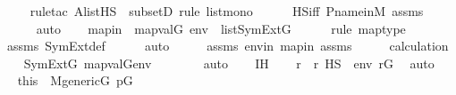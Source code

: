 \begin{isabellebody}
\ \ \ \ \isamarkupfalse%
{\isacharparenleft}{\kern0pt}rule{\isacharunderscore}{\kern0pt}tac\ A{\isacharequal}{\kern0pt}{\isachardoublequoteopen}list{\isacharparenleft}{\kern0pt}HS{\isacharparenright}{\kern0pt}{\isachardoublequoteclose}\ \ subsetD{\isacharcomma}{\kern0pt}\ rule\ list{\isacharunderscore}{\kern0pt}mono{\isacharparenright}{\kern0pt}\isanewline
\ \ \ \ \isamarkupfalse%
\ HS{\isacharunderscore}{\kern0pt}iff\ P{\isacharunderscore}{\kern0pt}name{\isacharunderscore}{\kern0pt}in{\isacharunderscore}{\kern0pt}M\ assms\isanewline
\ \ \ \ \isamarkupfalse%
\ auto\isanewline
\ \ \isamarkupfalse%
\ mapin\ {\isacharcolon}{\kern0pt}\ {\isachardoublequoteopen}map{\isacharparenleft}{\kern0pt}val{\isacharparenleft}{\kern0pt}G{\isacharparenright}{\kern0pt}{\isacharcomma}{\kern0pt}\ env{\isacharparenright}{\kern0pt}\ {\isasymin}\ list{\isacharparenleft}{\kern0pt}SymExt{\isacharparenleft}{\kern0pt}G{\isacharparenright}{\kern0pt}{\isacharparenright}{\kern0pt}{\isachardoublequoteclose}\ \isanewline
\ \ \ \ \isamarkupfalse%
{\isacharparenleft}{\kern0pt}rule\ map{\isacharunderscore}{\kern0pt}type{\isacharparenright}{\kern0pt}\isanewline
\ \ \ \ \isamarkupfalse%
\ assms\ SymExt{\isacharunderscore}{\kern0pt}def\isanewline
\ \ \ \ \isamarkupfalse%
\ auto\isanewline
\ \isanewline
\ \ \isamarkupfalse%
\ assms\ envin\ mapin\ assms{}\isanewline
\ \ \isamarkupfalse%
\ \isamarkupfalse%
\ calculation\isanewline
\ \ \isamarkupfalse%
\ {\isachardoublequoteopen}SymExt{\isacharparenleft}{\kern0pt}G{\isacharparenright}{\kern0pt}{\isacharcomma}{\kern0pt}\ map{\isacharparenleft}{\kern0pt}val{\isacharparenleft}{\kern0pt}G{\isacharparenright}{\kern0pt}{\isacharcomma}{\kern0pt}env{\isacharparenright}{\kern0pt}\ {\isasymTurnstile}\ {\isasymphi}{\isachardoublequoteclose}\isanewline
\ \ \ \ \isamarkupfalse%
\ auto\isanewline
\ \ \isamarkupfalse%
\ IH\isanewline
\ \ \isamarkupfalse%
\ r\ \ {\isachardoublequoteopen}r\ {\isasymtturnstile}HS\ {\isasymphi}\ env{\isachardoublequoteclose}\ {\isachardoublequoteopen}r{\isasymin}G{\isachardoublequoteclose}\ \isamarkupfalse%
\ auto\isanewline
\ \ \isamarkupfalse%
\ \isamarkupfalse%
\ this\ \ {\isacartoucheopen}M{\isacharunderscore}{\kern0pt}generic{\isacharparenleft}{\kern0pt}G{\isacharparenright}{\kern0pt}{\isacartoucheclose}\ {\isacartoucheopen}p{\isasymin}G{\isacartoucheclose}\isanewline

\end{isabellebody}
